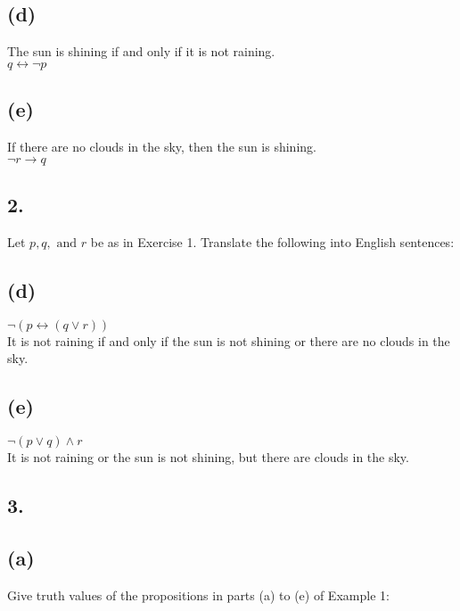 \documentclass[11pt]{article}
\begin{document}
\subsection*{(d)}
\begin{center}
The sun is shining if and only if it is not raining.\\
\hfill \break
$q \longleftrightarrow \neg p$
\end{center}

\subsection*{(e)}
\begin{center}
If there are no clouds in the sky, then the sun is shining.\\
\hfill \break
$\neg r \rightarrow q$
\end{center}
%
%
\subsection*{2.}
\begin{center}
Let $p,q, \text{ and } r$ be as in Exercise 1. Translate the following into English sentences:
\end{center}

\subsection*{(d)}
\begin{center}
$\neg(p \longleftrightarrow (q \vee r))$\\
It is not raining if and only if the sun is not shining or there are no clouds in the sky.
\end{center}

\subsection*{(e)}
\begin{center}
$\neg(p \vee q) \wedge r$\\
It is not raining or the sun is not shining, but there are clouds in the sky.
\end{center}
%
%
\subsection*{3.}

\subsection*{(a)}
\begin{center}
Give truth values of the propositions in parts (a) to (e) of Example 1:\\
\end{center}
\end{document}

